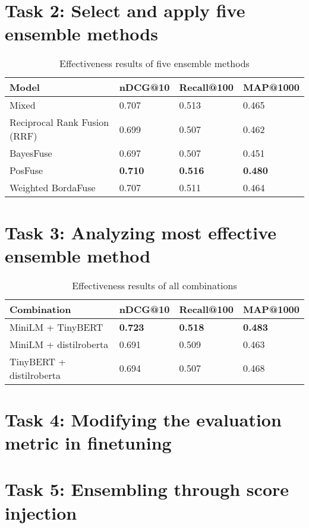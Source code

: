 \documentclass[acmsmall]{acmart}
\begin{document}
\section{Task 2: Select and apply five ensemble methods}
\begin{table}[!ht]
    \centering
    \caption{Effectiveness results of five ensemble methods}
    \label{tab:results-task2}
    \begin{tabular}{llll}
       \toprule
       \textbf{Model} &  \textbf{nDCG@10} & \textbf{Recall@100} & \textbf{MAP@1000}\\
       \midrule
       Mixed & 0.707 & 0.513 & 0.465\\
       Reciprocal Rank Fusion (RRF) & 0.699 & 0.507 & 0.462\\
       BayesFuse & 0.697 & 0.507 & 0.451\\
       PosFuse & \textbf{0.710} & \textbf{0.516} & \textbf{0.480}\\
       Weighted BordaFuse & 0.707 & 0.511 & 0.464\\
       \bottomrule
    \end{tabular}
\end{table}

\section{Task 3: Analyzing most effective ensemble method}
\begin{table}[!ht]
    \centering
    \caption{Effectiveness results of all combinations}
    \label{tab:results-task3}
    \begin{tabular}{llll}
       \toprule
       \textbf{Combination} & \textbf{nDCG@10} & \textbf{Recall@100} & \textbf{MAP@1000}\\
       \midrule
       MiniLM + TinyBERT & \textbf{0.723} & \textbf{0.518} & \textbf{0.483}\\
       MiniLM + distilroberta & 0.691 & 0.509 & 0.463\\
       TinyBERT + distilroberta & 0.694 & 0.507 & 0.468\\
       \bottomrule
    \end{tabular}
\end{table}

\section{Task 4: Modifying the evaluation metric in finetuning}

\section{Task 5: Ensembling through score injection}





\end{document}
